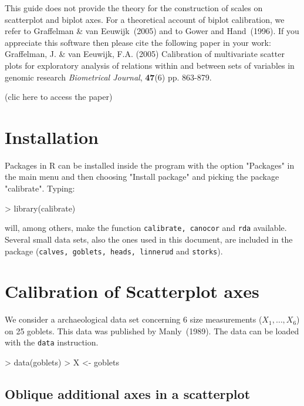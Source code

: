 \documentclass[a4paper]{article}
\begin{document}
This guide does not provide the theory for the construction of scales on scatterplot
and biplot axes. For a theoretical account of biplot calibration, we refer to Graffelman
\& van Eeuwijk~(2005) and to Gower and Hand~(1996). If you appreciate 
this software then please cite the following paper in your work:\\

Graffelman, J. \& van Eeuwijk, F.A. (2005) Calibration of multivariate scatter plots for 
exploratory analysis of relations within and between sets of variables in genomic research
{\it Biometrical Journal}, {\bf 47}(6) pp. 863-879.
(clic here to access the paper)

\section{Installation}
\label{sec:install}


Packages in R can be installed inside the program with the option "Packages"
in the main menu and then choosing "Install package" and picking the package
"calibrate". Typing:

\begin{Schunk}
\begin{Sinput}
> library(calibrate)
\end{Sinput}
\end{Schunk}

will, among others, make the function {\tt calibrate, canocor} and {\tt rda} available. Several
small data sets, also the ones used in this document, are included in the package ({\tt calves, goblets,
heads, linnerud} and {\tt storks}).

\section{Calibration of Scatterplot axes}
\label{sec:scatter}

We consider a archaeological data set concerning 6 size measurements ($X_1, \ldots, X_6$) on 25 
goblets. This data was published by Manly~(1989). The data can be loaded with
the {\tt data} instruction. 
\begin{Schunk}
\begin{Sinput}
> data(goblets)
> X <- goblets
\end{Sinput}
\end{Schunk}

\subsection*{Oblique additional axes in a scatterplot}
\end{document}
